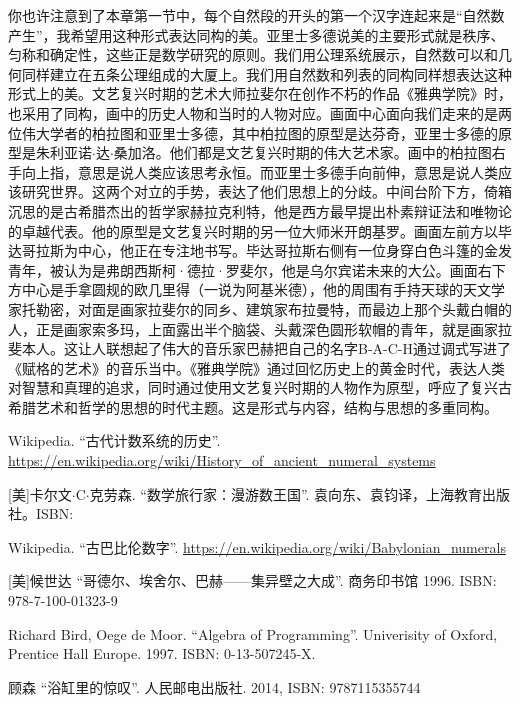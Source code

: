 \documentclass[UTF8]{article}
\begin{document}
你也许注意到了本章第一节中，每个自然段的开头的第一个汉字连起来是“自然数产生”，我希望用这种形式表达同构的美。亚里士多德说美的主要形式就是秩序、匀称和确定性，这些正是数学研究的原则。我们用公理系统展示，自然数可以和几何同样建立在五条公理组成的大厦上。我们用自然数和列表的同构同样想表达这种形式上的美。文艺复兴时期的艺术大师拉斐尔在创作不朽的作品《雅典学院》时，也采用了同构，画中的历史人物和当时的人物对应。画面中心面向我们走来的是两位伟大学者的柏拉图和亚里士多德，其中柏拉图的原型是达芬奇，亚里士多德的原型是朱利亚诺$\cdot$达$\cdot$桑加洛。他们都是文艺复兴时期的伟大艺术家。画中的柏拉图右手向上指，意思是说人类应该思考永恒。而亚里士多德手向前伸，意思是说人类应该研究世界。这两个对立的手势，表达了他们思想上的分歧。中间台阶下方，倚箱沉思的是古希腊杰出的哲学家赫拉克利特，他是西方最早提出朴素辩证法和唯物论的卓越代表。他的原型是文艺复兴时期的另一位大师米开朗基罗。画面左前方以毕达哥拉斯为中心，他正在专注地书写。毕达哥拉斯右侧有一位身穿白色斗篷的金发青年，被认为是弗朗西斯柯·德拉·罗斐尔，他是乌尔宾诺未来的大公。画面右下方中心是手拿圆规的欧几里得（一说为阿基米德），他的周围有手持天球的天文学家托勒密，对面是画家拉斐尔的同乡、建筑家布拉曼特，而最边上那个头戴白帽的人，正是画家索多玛，上面露出半个脑袋、头戴深色圆形软帽的青年，就是画家拉斐本人。这让人联想起了伟大的音乐家巴赫把自己的名字B-A-C-H通过调式写进了《赋格的艺术》的音乐当中。《雅典学院》通过回忆历史上的黄金时代，表达人类对智慧和真理的追求，同时通过使用文艺复兴时期的人物作为原型，呼应了复兴古希腊艺术和哲学的思想的时代主题。这是形式与内容，结构与思想的多重同构。

\ifx\wholebook\relax \else
\begin{thebibliography}{99}

Wikipedia. ``古代计数系统的历史''. \url{https://en.wikipedia.org/wiki/History_of_ancient_numeral_systems}

[美]卡尔文$\cdot$C$\cdot$克劳森. ``数学旅行家：漫游数王国''. 袁向东、袁钧译，上海教育出版社。ISBN:

Wikipedia. ``古巴比伦数字''. \url{https://en.wikipedia.org/wiki/Babylonian_numerals}

[美]候世达 ``哥德尔、埃舍尔、巴赫——集异壁之大成''. 商务印书馆 1996. ISBN: 978-7-100-01323-9

Richard Bird, Oege de Moor. ``Algebra of Programming''. Univerisity of Oxford, Prentice Hall Europe. 1997. ISBN: 0-13-507245-X.

顾森 ``浴缸里的惊叹''. 人民邮电出版社. 2014, ISBN: 9787115355744

\end{thebibliography}

\expandafter\enddocument

\fi
\end{document}

